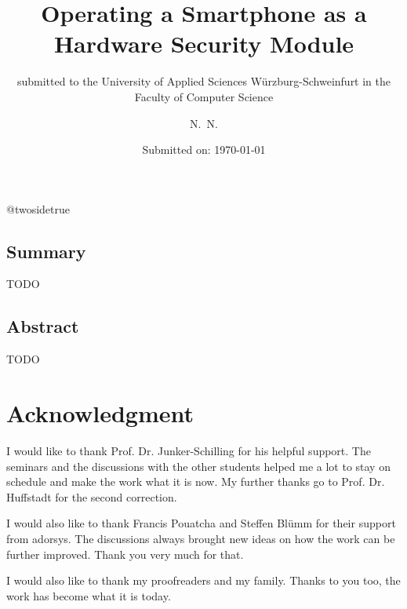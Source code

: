 \documentclass[12pt,oneside,a4paper,parskip]{scrbook}
\makeatletter
\def\BaAuthor{Achim Winter}
\def\BaAuthorStudyProgram{Computer Science}
\def\BaType{Bachelor thesis} %
\def\BaTitle{Operating a Smartphone as a Hardware Security Module}
\def\BaSupervisorOne{Prof.\ Dr.\ Junker-Schilling}
\def\BaSupervisorTwo{Prof.\ Dr.\ Huffstadt}
\def\BaDeadline{\today}
\def\ShowBaAuthor{\BaAuthor}
\def\ShowBaAuthor{N.~N.}
\newcommand*{\forcetwosidetitle}[1][1]{%
 \begingroup
   \cleardoubleoddpage
   \KOMAoptions{titlepage=true}%
   \csname @twosidetrue\endcsname
   \maketitle[{#1}]
 \endgroup
}
\makeatother
\begin{document}


\frontmatter
\titlehead{%
  {University of applied Sciences W\"{u}rzburg-Schweinfurt\\
   Faculty of Computer Science und Business Informatics}}
\subject{\BaType}
\title{\BaTitle\\[15mm]}
\subtitle{\normalsize{submitted to the University of Applied Sciences W\"{u}rzburg-Schweinfurt in the Faculty of \BaAuthorStudyProgram}}
\author{\ShowBaAuthor}
\date{\normalsize{Submitted on: \BaDeadline}}
\publishers{
  \normalsize{First Supervisor: \BaSupervisorOne}\\
  \normalsize{Second Supervisor: \BaSupervisorTwo}\\
}

\forcetwosidetitle



\section*{Summary}
TODO

\section*{Abstract}

TODO

\newpage
\chapter*{Acknowledgment}

I would like to thank Prof. Dr. Junker-Schilling for his helpful support. The seminars and the discussions with the other students helped me a lot to stay on schedule and make the work what it is now. My further thanks go to Prof. Dr. Huffstadt for the second correction. 

I would also like to thank Francis Pouatcha and Steffen Blümm for their support from adorsys. The discussions always brought new ideas on how the work can be further improved. Thank you very much for that.

I would also like to thank my proofreaders and my family. Thanks to you too, the work has become what it is today.

\tableofcontents
\end{document}
